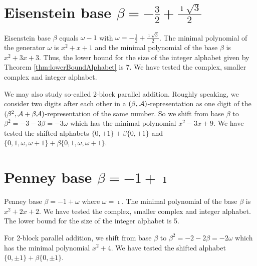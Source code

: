 \newpage
\section{\texorpdfstring{Eisenstein base $\beta = -\frac{3}{2} + \frac{\imath \sqrt{3}}{2}$}{Eisenstein base beta = -3/2 + i sqrt(3)/2}}
Eisenstein base $\beta$ equals $\omega - 1$ with $\omega =-\frac{1}{2} + \frac{\imath \sqrt{3}}{2}$. The minimal polynomial of the generator $\omega$ is $x^2 + x+1$ and the minimal polynomial of the base $\beta$ is $x^2 + 3x+3$. Thus, the lower bound for the size of the integer alphabet given by Theorem \ref{thm:lowerBoundAlphabet} is 7. We have tested the complex, smaller complex and integer alphabet.
  




We may also study so-called 2-block parallel addition. Roughly speaking, we consider two digits after each other in a $(\beta,\mathcal{A})$-representation as one digit of the $(\beta^2,\mathcal{A}+\beta\mathcal{A})$-representation of the same number. So we shift from base $\beta$ to $\beta^2=-3-3\beta=-3\omega$ which has the minimal polynomial $x^2-3x+9$. We have tested the shifted alphabets $\{0,\pm 1\}+\beta \{0,\pm 1\}$ and $\{0,1, \omega, \omega +1\}+\beta \{0,1, \omega, \omega +1\}$.
  



\section{\texorpdfstring{Penney base $\beta = -1 + \imath$}{Penney base beta = -1 + i}}
Penney base $\beta = -1 + \omega$ where $\omega=\imath$. The minimal polynomial of the base $\beta$ is $x^2 + 2x+2$. We have tested the complex, smaller complex and integer alphabet. The lower bound for the size of the integer alphabet is 5.




For 2-block parallel addition, we shift from base $\beta$ to $\beta^2=-2-2\beta=-2\omega$ which has the minimal polynomial $x^{2} + 4$. We have tested the shifted alphabet $\{0,\pm 1\}+\beta \{0,\pm 1\}$.



